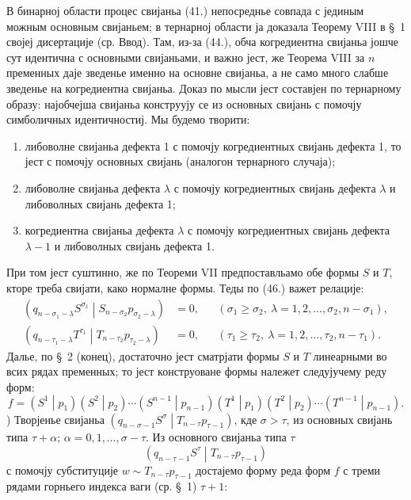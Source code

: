 ﻿\documentclass[11pt]{article}
\newcommand{\pair}[2]{\left(#1\middle|#2\right)}
\begin{document}
В бинарној области процес свијаньа (41.) непосреднье совпада с јединым можным основным свијаньем; в тернарној области ја доказала Теорему VIII в \S\ 1 својеј дисертације (ср. Ввод). Там, из-за (44.), обча когредиентна свијаньа јошче сут идентична с основными свијаньами, и важно јест, же Теорема VIII за $n$ пременных даје зведенье именно на основне свијаньа, а не само много слабше зведенье на когредиентна свијаньа. Доказ по мысли јест составјен по тернарному образу: најобчејша свијаньа конструују се из основных свијань с помочју симболичных идентичностиј. Мы будемо творити:
\begin{enumerate}
\item либоволне свијаньа дефекта 1 с помочју когредиентных свијань дефекта 1, то јест с помочју основных свијань (аналогон тернарного случаја);
\item либоволне свијаньа дефекта $\lambda$ с помочју когредиентных свијань дефекта $\lambda$ и либоволных свијань дефекта 1;
\item когредиентна свијаньа дефекта $\lambda$ с помочју когредиентных свијань дефекта $\lambda-1$ и либоволных свијань дефекта 1.
\end{enumerate}
При том јест суштинно, же по Теореми VII предпоставльамо обе формы $S$ и $T$, кторе треба свијати, како нормалне формы. Теды по (46.) важет релације:
\begin{equation}
\begin{aligned}
\pair{q_{n-\sigma_1-\lambda}S^{\sigma_1}}{S_{n-\sigma_2}p_{\sigma_2-\lambda}}&=0,
&& (\sigma_1\ge\sigma_2,\ \lambda=1,2,\ldots,\sigma_2,n-\sigma_1),\\
\pair{q_{n-\tau_1-\lambda}T^{\tau_1}}{T_{n-\tau_2}p_{\tau_2-\lambda}}&=0,
&& (\tau_1\ge\tau_2,\ \lambda=1,2,\ldots,\tau_2,n-\tau_1).
\end{aligned}
\tag{62}
\end{equation}
Далье, по \S\ 2 (конец), достаточно јест сматрјати формы $S$ и $T$ линеарными во всих рядах пременных; то јест конструоване формы належет следујучему реду форм:
\[
 f=\pair{S^1}{p_1}\pair{S^2}{p_2}\cdots\pair{S^{n-1}}{p_{n-1}}
   \pair{T^1}{p_1}\pair{T^2}{p_2}\cdots\pair{T^{n-1}}{p_{n-1}}.
\]
) Творјенье свијаньа $\pair{q_{n-\sigma-1}S^\sigma}{T_{n-\tau}p_{\tau-1}}$, кде $\sigma>\tau$, из основных свијань типа $\tau+\alpha$; $\alpha=0,1,\ldots,\sigma-\tau$. Из основного свијаньа типа $\tau$
\[
 \pair{q_{n-\tau-1}S^\tau}{T_{n-\tau}p_{\tau-1}}
\]
с помочју субституције $w\sim T_{n-\tau}p_{\tau-1}$ достајемо форму реда форм $f$ с треми рядами горньего индекса ваги (ср. \S\ 1) $\tau+1$:
\end{document}
